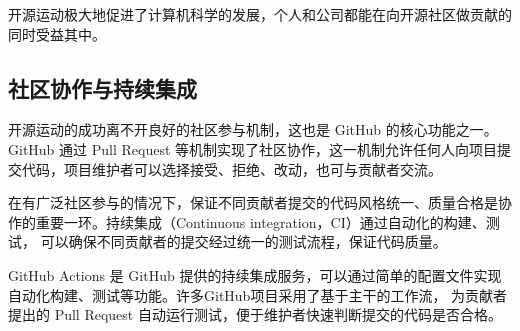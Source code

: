 \documentclass[../main.tex]{subfiles}
\begin{document}
开源运动极大地促进了计算机科学的发展，个人和公司都能在向开源社区做贡献的同时受益其中。

\subsection{社区协作与持续集成}

开源运动的成功离不开良好的社区参与机制，这也是 GitHub 的核心功能之一。GitHub 通过 Pull Request 等机制实现了社区协作，这一机制允许任何人向项目提交代码，项目维护者可以选择接受、拒绝、改动，也可与贡献者交流。

在有广泛社区参与的情况下，保证不同贡献者提交的代码风格统一、质量合格是协作的重要一环。持续集成（Continuous integration，CI）通过自动化的构建、测试，
可以确保不同贡献者的提交经过统一的测试流程，保证代码质量。

GitHub Actions 是 GitHub 提供的持续集成服务，可以通过简单的配置文件实现自动化构建、测试等功能。许多GitHub项目采用了基于主干的工作流，
为贡献者提出的 Pull Request 自动运行测试，便于维护者快速判断提交的代码是否合格。
\end{document}
